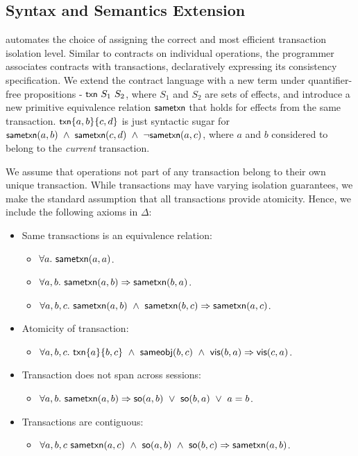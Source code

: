 \subsection{Syntax and Semantics Extension}
\label{q_sec:syn_sem_ext}

\quelea automates the choice of assigning the correct and most efficient
transaction isolation level. Similar to contracts on individual operations, the
programmer associates contracts with transactions, declaratively expressing its
consistency specification. We extend the contract language with a new term
under quantifier-free propositions - ${\small {\normalfont \textsf{txn}}}~S_1~S_2$, where $S_1$ and
$S_2$ are sets of effects, and introduce a new primitive equivalence relation
$\small {\normalfont \textsf{sametxn}}$ that holds for effects from the same transaction. $\small
{\normalfont \textsf{txn}}\{a,b\}\{c,d\}$ is just syntactic sugar for $\small {\normalfont \textsf{sametxn}(a,b)} ~\wedge~
{\normalfont \textsf{sametxn}(c,d)} ~\wedge~ \neg{\normalfont \textsf{sametxn}(a,c)}$, where $a$ and $b$ considered to
belong to the \emph{current} transaction.

We assume that operations not part of any transaction belong to their own
unique transaction. While transactions may have varying isolation guarantees,
we make the standard assumption that all transactions provide atomicity. Hence,
we include the following axioms in $\Delta$:

\begin{itemize}
\item Same transactions is an equivalence relation:
	\begin{itemize}
	\item $\forall a.~{\normalfont \textsf{sametxn}(a,a)}$.
	\item $\forall a,b.~{\normalfont \textsf{sametxn}(a,b)} \Rightarrow {\normalfont \textsf{sametxn}(b,a)}$.
	\item $\forall a,b,c.~{\normalfont \textsf{sametxn}(a,b)} ~\wedge~ {\normalfont \textsf{sametxn}(b,c)} \Rightarrow {\normalfont \textsf{sametxn}(a,c)}$.
	\end{itemize}
\item Atomicity of transaction:
	\begin{itemize}
	\item $\forall a,b,c.~{\normalfont \textsf{txn}}\{a\}\{b,c\} ~\wedge~ {\normalfont \textsf{sameobj}(b,c)} ~\wedge~ {\normalfont \textsf{vis}(b,a)} \Rightarrow {\normalfont \textsf{vis}(c,a)}$.
	\end{itemize}
\item Transaction does not span across sessions:
	\begin{itemize}
	\item $\forall a,b.~{\normalfont \textsf{sametxn}(a,b)} \Rightarrow {\normalfont \textsf{so}(a,b)} ~\vee~ {\normalfont \textsf{so}(b,a)} ~\vee~ a = b$.
	\end{itemize}
\item Transactions are contiguous:
	\begin{itemize}
	\item $\forall a,b,c~{\normalfont \textsf{sametxn}(a,c)} ~\wedge~ {\normalfont \textsf{so}(a,b)} ~\wedge~ {\normalfont \textsf{so}(b,c)} \Rightarrow {\normalfont \textsf{sametxn}(a,b)}$.
	\end{itemize}
\end{itemize}

